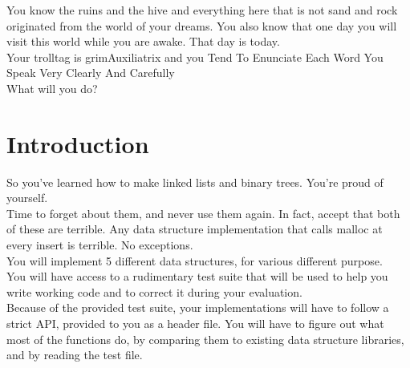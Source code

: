 \documentclass{42-en}
\begin{document}
    You know the ruins and the hive and everything here that is not sand and rock originated from the world of your dreams.
    You also know that one day you will visit this world while you are awake. That day is today.\\

    Your trolltag is grimAuxiliatrix and you Tend To Enunciate Each Word You Speak Very Clearly And Carefully\\

    What will you do?

\chapter{Introduction}

    So you've learned how to make linked lists and binary trees. You're proud of yourself.\\

    Time to forget about them, and never use them again. In fact, accept that both of these are terrible.
    Any data structure implementation that calls malloc at every insert is terrible. No exceptions.\\

    You will implement 5 different data structures, for various different purpose.\\

    You will have access to a rudimentary test suite that will be used to help you
    write working code and to correct it during your evaluation.\\

    Because of the provided test suite, your implementations will have to follow a strict
    API, provided to you as a header file. You will have to figure out what most
    of the functions do, by comparing them to existing data structure libraries,
    and by reading the test file.


\end{document}
